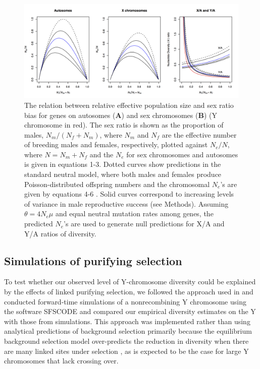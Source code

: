 \documentclass[9pt,twocolumn,twoside]{gsajnl}
\begin{document}
\begin{figure}[htbp]
\centering
\noindent
\includegraphics[width=\linewidth]{figure1.jpg}
\caption{The relation between relative effective population size and sex ratio bias for genes on autosomes (\textbf{A}) and sex chromosomes (\textbf{B}) (Y chromosome in red). The sex ratio is shown as the proportion of males, $N_{m}/(N_{f}+N_{m})$, where $N_{m}$ and $N_{f}$ are the effective number of breeding males and females, respectively, plotted against $N_{e}/N$, where $N=N_{m}+N_{f}$ and the $N_{e}$ for sex chromosomes and autosomes is given in equations 1-3. Dotted curves show predictions in the standard neutral model, where both males and females produce Poisson-distributed offspring numbers and the chromosomal $N_{e}$'s are given by equations 4-6 \citep{wright1931evolution}. Solid curves correspond to increasing levels of variance in male reproductive success \citep{nomura2002effective} (see Methods). Assuming $\theta=4N_{e}\mu$ and equal neutral mutation rates among genes, the predicted $N_{e}$'s are used to generate null predictions for X/A and Y/A ratios of diversity.
}
\label{fig:spectrum}
\end{figure}

\subsection*{Simulations of purifying selection}
To test whether our observed level of Y-chromosome diversity could be explained by the effects of linked purifying selection, we followed the approach used in \citep{Wilsonsayres2014} and conducted forward-time simulations of a nonrecombining Y chromosome using the software SFSCODE \citep{hernandez2008flexible} and compared our empirical diversity estimates on the Y with those from simulations. This approach was implemented rather than using analytical predictions of background selection primarily because the equilibrium background selection model over-predicts the reduction in diversity when there are many linked sites under selection \citep{KaiserCharlesworth}, as is expected to be the case for large Y chromosomes that lack crossing over.
\end{document}
